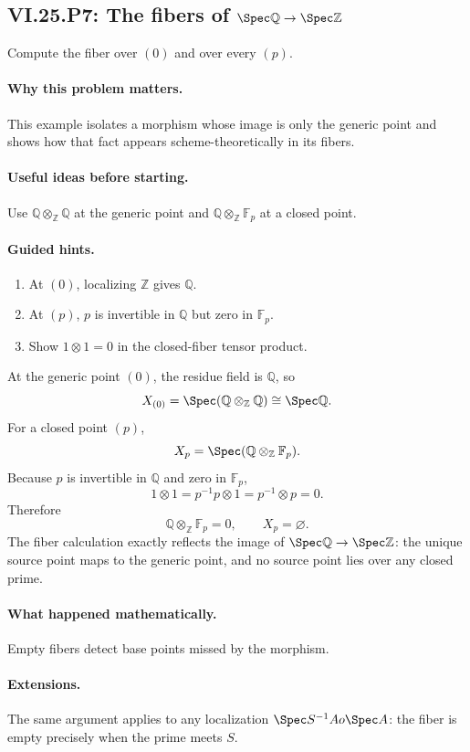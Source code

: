 \subsection*{VI.25.P7: The fibers of \(\Spec\mathbb Q\to\Spec\mathbb Z\)}
\begin{problem}\label{prob:vi25-p07}
Compute the fiber over \((0)\) and over every \((p)\).
\end{problem}

\ifdefined\FullProblemDossiers
\paragraph{Why this problem matters.}
This example isolates a morphism whose image is only the generic point and shows how that fact appears scheme-theoretically in its fibers.

\paragraph{Useful ideas before starting.}
Use \(\mathbb Q\otimes_{\mathbb Z}\mathbb Q\) at the generic point and \(\mathbb Q\otimes_{\mathbb Z}\mathbb F_p\) at a closed point.

\paragraph{Guided hints.}
\begin{enumerate}
\item At \((0)\), localizing \(\mathbb Z\) gives \(\mathbb Q\).
\item At \((p)\), \(p\) is invertible in \(\mathbb Q\) but zero in \(\mathbb F_p\).
\item Show \(1\otimes1=0\) in the closed-fiber tensor product.
\end{enumerate}

\begin{solution}
At the generic point \((0)\), the residue field is \(\mathbb Q\), so
\[
X_{(0)}
=
\Spec(\mathbb Q\otimes_{\mathbb Z}\mathbb Q)
\cong
\Spec\mathbb Q.
\]
For a closed point \((p)\),
\[
X_p
=
\Spec(\mathbb Q\otimes_{\mathbb Z}\mathbb F_p).
\]
Because \(p\) is invertible in \(\mathbb Q\) and zero in \(\mathbb F_p\),
\[
1\otimes1
=
p^{-1}p\otimes1
=
p^{-1}\otimes p
=
0.
\]
Therefore
\[
\mathbb Q\otimes_{\mathbb Z}\mathbb F_p=0,
\qquad
X_p=\varnothing.
\]
The fiber calculation exactly reflects the image of \(\Spec\mathbb Q\to\Spec\mathbb Z\): the unique source point maps to the generic point, and no source point lies over any closed prime.
\end{solution}

\paragraph{What happened mathematically.}
Empty fibers detect base points missed by the morphism.

\paragraph{Extensions.}
The same argument applies to any localization \(\Spec S^{-1}A	o\Spec A\): the fiber is empty precisely when the prime meets \(S\).
\fi
